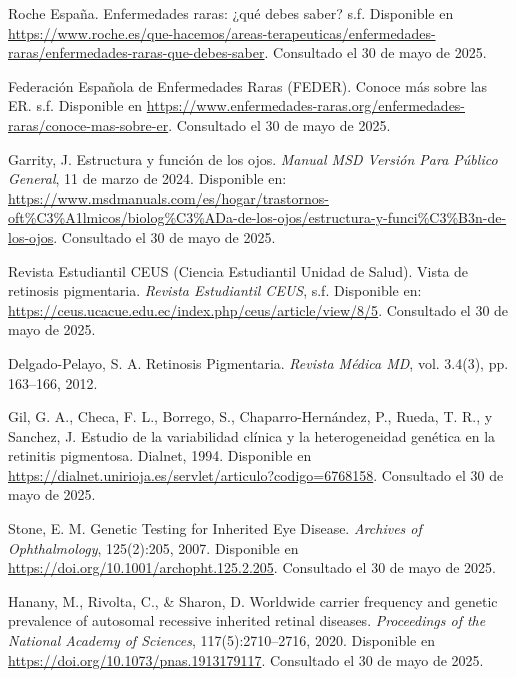 \documentclass[11pt,spanish,listoffigures,listoftables]{tfgetsinf}
\begin{document}
\begin{thebibliography}{99}
   Roche España.  
   \newblock Enfermedades raras: ¿qué debes saber?  
   \newblock s.f.  
   \newblock Disponible en  
   \url{https://www.roche.es/que-hacemos/areas-terapeuticas/enfermedades-raras/enfermedades-raras-que-debes-saber}.  
   \newblock Consultado el 30 de mayo de 2025.

   Federación Española de Enfermedades Raras (FEDER).  
   \newblock Conoce más sobre las ER.  
   \newblock s.f.  
   \newblock Disponible en  
   \url{https://www.enfermedades-raras.org/enfermedades-raras/conoce-mas-sobre-er}.  
   \newblock Consultado el 30 de mayo de 2025.


   Garrity, J.  
   \newblock Estructura y función de los ojos.  
   \newblock \textit{Manual MSD Versión Para Público General}, 11 de marzo de 2024.  
   \newblock Disponible en: 
   \url{https://www.msdmanuals.com/es/hogar/trastornos-oft%C3%A1lmicos/biolog%C3%ADa-de-los-ojos/estructura-y-funci%C3%B3n-de-los-ojos}.  
   \newblock Consultado el 30 de mayo de 2025.

   Revista Estudiantil CEUS (Ciencia Estudiantil Unidad de Salud).  
   \newblock Vista de retinosis pigmentaria.  
   \newblock \textit{Revista Estudiantil CEUS}, s.f.  
   \newblock Disponible en: 
   \url{https://ceus.ucacue.edu.ec/index.php/ceus/article/view/8/5}.  
   \newblock Consultado el 30 de mayo de 2025.

   Delgado-Pelayo, S. A.  
   \newblock Retinosis Pigmentaria.  
   \newblock \textit{Revista Médica MD}, vol. 3.4(3), pp. 163--166, 2012.


   Gil, G. A., Checa, F. L., Borrego, S., Chaparro-Hernández, P., Rueda, T. R., y Sanchez, J.  
   \newblock Estudio de la variabilidad clínica y la heterogeneidad genética en la retinitis pigmentosa.  
   \newblock Dialnet, 1994.    
   \newblock Disponible en  
   \url{https://dialnet.unirioja.es/servlet/articulo?codigo=6768158}.
   \newblock Consultado el 30 de mayo de 2025.

   Stone, E. M.  
   \newblock Genetic Testing for Inherited Eye Disease.  
   \newblock \textit{Archives of Ophthalmology}, 125(2):205, 2007.  
   \newblock Disponible en
   \newblock \url{https://doi.org/10.1001/archopht.125.2.205}.
   \newblock Consultado el 30 de mayo de 2025.

   Hanany, M., Rivolta, C., \& Sharon, D.  
   \newblock Worldwide carrier frequency and genetic prevalence of autosomal recessive inherited retinal diseases.  
   \newblock \textit{Proceedings of the National Academy of Sciences}, 117(5):2710–2716, 2020.  
   \newblock Disponible en
   \newblock \url{https://doi.org/10.1073/pnas.1913179117}.
   \newblock Consultado el 30 de mayo de 2025.


\end{thebibliography}
\end{document}
